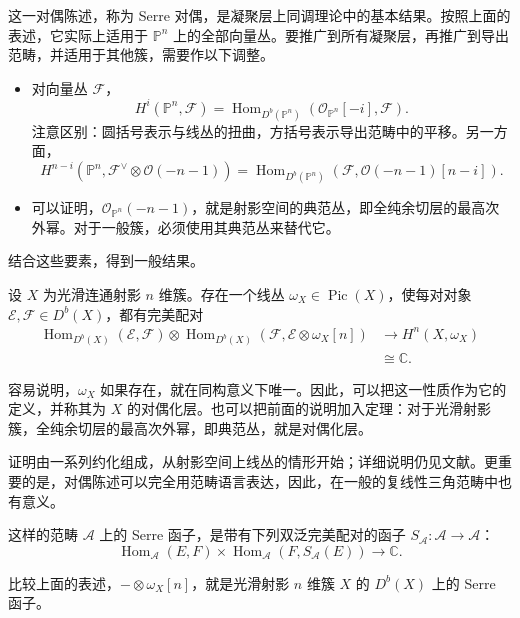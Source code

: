 这一对偶陈述，称为 Serre 对偶，是凝聚层上同调理论中的基本结果。按照上面的表述，它实际上适用于 $\mathbb{P}^n$ 上的全部向量丛。要推广到所有凝聚层，再推广到导出范畴，并适用于其他簇，需要作以下调整。
\begin{itemize}
\item 对向量丛 $\mathcal{F}$，
\[
H^i(\mathbb{P}^n,\mathcal{F})
=\operatorname{Hom}_{D^b(\mathbb{P}^n)}(\mathcal{O}_{\mathbb{P}^n}[-i],\mathcal{F}).
\]
注意区别：圆括号表示与线丛的扭曲，方括号表示导出范畴中的平移。另一方面，
\[
H^{n-i}(\mathbb{P}^n,\mathcal{F}^{\vee}\otimes\mathcal{O}(-n-1))
=\operatorname{Hom}_{D^b(\mathbb{P}^n)}(\mathcal{F},\mathcal{O}(-n-1)[n-i]).
\]
\item 可以证明，$\mathcal{O}_{\mathbb{P}^n}(-n-1)$，就是射影空间的典范丛，即全纯余切层的最高次外幂。对于一般簇，必须使用其典范丛来替代它。
\end{itemize}
结合这些要素，得到一般结果。

\begin{theorem}[Serre 对偶]\label{thm:4.68}
设 $X$ 为光滑连通射影 $n$ 维簇。存在一个线丛 $\omega_X\in\operatorname{Pic}(X)$，使每对对象 $\mathcal{E},\mathcal{F}\in D^b(X)$，都有完美配对
\[
\begin{aligned}
\operatorname{Hom}_{D^b(X)}(\mathcal{E},\mathcal{F})\otimes
\operatorname{Hom}_{D^b(X)}(\mathcal{F},\mathcal{E}\otimes\omega_X[n])
&\longrightarrow H^n(X,\omega_X)\\
&\cong\mathbb{C}.
\end{aligned}
\]
\end{theorem}

容易说明，$\omega_X$ 如果存在，就在同构意义下唯一。因此，可以把这一性质作为它的定义，并称其为 $X$ 的对偶化层。也可以把前面的说明加入定理：对于光滑射影簇，全纯余切层的最高次外幂，即典范丛，就是对偶化层。

证明由一系列约化组成，从射影空间上线丛的情形开始；详细说明仍见文献。更重要的是，对偶陈述可以完全用范畴语言表达，因此，在一般的复线性三角范畴中也有意义。
\begin{definition*}\label{def:4.serre-functor}
这样的范畴 $\mathcal{A}$ 上的 Serre 函子，是带有下列双泛完美配对的函子 $S_{\mathcal{A}}\colon\mathcal{A}\to\mathcal{A}$：
\[
\operatorname{Hom}_{\mathcal{A}}(E,F)\times
\operatorname{Hom}_{\mathcal{A}}(F,S_{\mathcal{A}}(E))
\longrightarrow\mathbb{C}.
\]
\end{definition*}
比较上面的表述，$-\otimes\omega_X[n]$，就是光滑射影 $n$ 维簇 $X$ 的 $D^b(X)$ 上的 Serre 函子。

